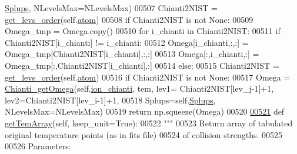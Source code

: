\begin{DoxyCode}
      \hyperlink{classpyneb_1_1utils_1_1pn__chianti_1_1___coll_chianti_abbdbf5533a480f46baceccc2885d7467}{Splups}, NLevelsMax=NLevelsMax)
00507             Chianti2NIST = \hyperlink{namespacepyneb_1_1utils_1_1pn__chianti_aa5ac8c15155a7a63ddaefa054349ea16}{get\_levs\_order}(self.\hyperlink{classpyneb_1_1utils_1_1pn__chianti_1_1___coll_chianti_a904418982790fd63f2324fec90636bb6}{atom})
00508             \textcolor{keywordflow}{if} Chianti2NIST \textcolor{keywordflow}{is} \textcolor{keywordflow}{not} \textcolor{keywordtype}{None}:
00509                 Omega\_tmp = Omega.copy()
00510                 \textcolor{keywordflow}{for} i\_chianti \textcolor{keywordflow}{in} Chianti2NIST:
00511                     \textcolor{keywordflow}{if} Chianti2NIST[i\_chianti] != i\_chianti:
00512                         Omega[i\_chianti,:,:] = Omega\_tmp[Chianti2NIST[i\_chianti],:,:]
00513                         Omega[:,i\_chianti,:] = Omega\_tmp[:,Chianti2NIST[i\_chianti],:]
00514         \textcolor{keywordflow}{else}:
00515             Chianti2NIST = \hyperlink{namespacepyneb_1_1utils_1_1pn__chianti_aa5ac8c15155a7a63ddaefa054349ea16}{get\_levs\_order}(self.\hyperlink{classpyneb_1_1utils_1_1pn__chianti_1_1___coll_chianti_a904418982790fd63f2324fec90636bb6}{atom})
00516             \textcolor{keywordflow}{if} Chianti2NIST \textcolor{keywordflow}{is} \textcolor{keywordflow}{not} \textcolor{keywordtype}{None}:
00517                 Omega = \hyperlink{namespacepyneb_1_1utils_1_1pn__chianti_a651b939729d0f5afb817a47a974bfaa1}{Chianti\_getOmega}(self.\hyperlink{classpyneb_1_1utils_1_1pn__chianti_1_1___coll_chianti_af0f28fb84d1ceb9d64e40429c981a6f6}{ion\_chianti}, tem, lev1=
      Chianti2NIST[lev\_j-1]+1, lev2=Chianti2NIST[lev\_i-1]+1, 
00518                              Splups=self.\hyperlink{classpyneb_1_1utils_1_1pn__chianti_1_1___coll_chianti_abbdbf5533a480f46baceccc2885d7467}{Splups}, NLevelsMax=NLevelsMax)
00519         \textcolor{keywordflow}{return} np.squeeze(Omega)
00520 
\hypertarget{pn__chianti_8py_source_l00521}{}\hyperlink{classpyneb_1_1utils_1_1pn__chianti_1_1___coll_chianti_a625343ac2c7b1f7c72f7717f7573d90e}{00521}     \textcolor{keyword}{def }\hyperlink{classpyneb_1_1utils_1_1pn__chianti_1_1___coll_chianti_a625343ac2c7b1f7c72f7717f7573d90e}{getTemArray}(self, keep\_unit=True):
00522         \textcolor{stringliteral}{"""}
00523 \textcolor{stringliteral}{        Return array of tabulated original temperature points (as in fits file) }
00524 \textcolor{stringliteral}{            of collision strengths.}
00525 \textcolor{stringliteral}{        }
00526 \textcolor{stringliteral}{        Parameters:}

\end{DoxyCode}
